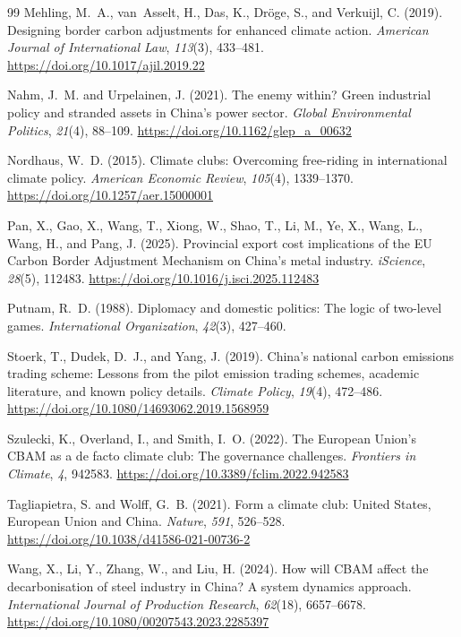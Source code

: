 \documentclass[letterpaper, 10pt, conference]{ieeeconf}
\begin{document}
\begin{thebibliography}{99}
Mehling, M.~A., van~Asselt, H., Das, K., Dr\"{o}ge, S., and Verkuijl, C. (2019).
Designing border carbon adjustments for enhanced climate action.
\textit{American Journal of International Law}, \textit{113}(3), 433--481.
\url{https://doi.org/10.1017/ajil.2019.22}

Nahm, J.~M. and Urpelainen, J. (2021).
The enemy within? {Green} industrial policy and stranded assets in {China}'s power sector.
\textit{Global Environmental Politics}, \textit{21}(4), 88--109.
\url{https://doi.org/10.1162/glep_a_00632}

Nordhaus, W.~D. (2015).
Climate clubs: Overcoming free-riding in international climate policy.
\textit{American Economic Review}, \textit{105}(4), 1339--1370.
\url{https://doi.org/10.1257/aer.15000001}

Pan, X., Gao, X., Wang, T., Xiong, W., Shao, T., Li, M., Ye, X., Wang, L., Wang, H., and Pang, J. (2025).
Provincial export cost implications of the {EU} {Carbon} {Border} {Adjustment} {Mechanism} on {China}'s metal industry.
\textit{iScience}, \textit{28}(5), 112483.
\url{https://doi.org/10.1016/j.isci.2025.112483}

Putnam, R.~D. (1988).
Diplomacy and domestic politics: The logic of two-level games.
\textit{International Organization}, \textit{42}(3), 427--460.

Stoerk, T., Dudek, D.~J., and Yang, J. (2019).
China's national carbon emissions trading scheme: Lessons from the pilot emission trading schemes, academic literature, and known policy details.
\textit{Climate Policy}, \textit{19}(4), 472--486.
\url{https://doi.org/10.1080/14693062.2019.1568959}

Szulecki, K., Overland, I., and Smith, I.~O. (2022).
The {European Union}'s {CBAM} as a de facto climate club: The governance challenges.
\textit{Frontiers in Climate}, \textit{4}, 942583.
\url{https://doi.org/10.3389/fclim.2022.942583}

Tagliapietra, S. and Wolff, G.~B. (2021).
Form a climate club: {United States}, {European Union} and {China}.
\textit{Nature}, \textit{591}, 526--528.
\url{https://doi.org/10.1038/d41586-021-00736-2}

Wang, X., Li, Y., Zhang, W., and Liu, H. (2024).
How will {CBAM} affect the decarbonisation of steel industry in {China}? A system dynamics approach.
\textit{International Journal of Production Research}, \textit{62}(18), 6657--6678.
\url{https://doi.org/10.1080/00207543.2023.2285397}


\end{thebibliography}
\end{document}
